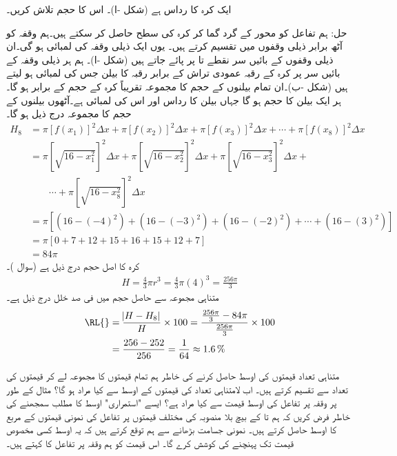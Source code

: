 ایک کرہ کا رداس  ہے (شکل -ا)۔ اس کا حجم تلاش کریں۔

حل:\quad
ہم تفاعل  کو  محور کے گرد گما کر کرہ کی سطح حاصل کر سکتے ہیں۔ہم وقفہ  کو آٹھ برابر ذیلی وقفوں میں تقسیم کرتے ہیں۔ یوں ایک ذیلی وقفہ کی لمبائی  ہو گی۔ان ذیلی وقفوں کے بائیں سر نقطے  تا  پر پائے جاتے ہیں (شکل -ا)۔ ہم ہر ذیلی وقفہ  کے بائیں سر پر کرہ کے رقبہ عمودی تراش کے برابر رقبہ کا بیلن جس کی لمبائی  ہو لیتے ہیں (شکل -ب)۔ان تمام بیلنوں  کے حجم کا مجموعہ تقریباً کرہ کے حجم کے برابر ہو گا۔ ہر ایک بیلن کا حجم  ہو گا جہاں بیلن کا رداس  اور اس کی لمبائی  ہے۔آٹھوں بیلنوں کے حجم کا مجموعہ درج ذیل ہو گا۔
\begin{align*}
H_8&=\pi[f(x_1)]^2\Delta x+\pi[f(x_2)]^2\Delta x+\pi[f(x_3)]^2\Delta x+\cdots+\pi[f(x_8)]^2\Delta x\\
&=\pi\left[\sqrt{16-x_1^2}\right]^2\Delta x+\pi\left[\sqrt{16-x_2^2}\right]^2\Delta x+\pi\left[\sqrt{16-x_3^2}\right]^2\Delta x+\\
&\quad\quad\cdots+\pi\left[\sqrt{16-x_8^2}\right]^2\Delta x\\
&=\pi[(16-(-4)^2)+(16-(-3)^2)+(16-(-2)^2)+\cdots+(16-(3)^2)]\\
&=\pi[0+7+12+15+16+15+12+7]\\
&=84\pi
\end{align*}
کرہ کا اصل حجم درج ذیل ہے (سوال )۔
\begin{align*}
H=\frac{4}{3}\pi r^3=\frac{4}{3}\pi (4)^3=\frac{256\pi}{3}
\end{align*}
متناہی مجموعہ سے حاصل حجم میں فی صد خلل درج ذیل ہے۔
\begin{align*}
\text{\RL{}}&=\frac{\abs{H-H_8}}{H}\times 100=\frac{\tfrac{256\pi}{3}-84\pi}{\tfrac{256\pi}{3}}\times 100\\
&=\frac{256-252}{256}=\frac{1}{64}\approx \SI{1.6}{\percent}
\end{align*}

متناہی تعداد قیمتوں کی اوسط حاصل کرنے کی خاطر ہم تمام قیمتوں کا مجموعہ لے کر قیمتوں کی تعداد سے تقسیم کرتے ہیں۔ اب لامتناہی تعداد کی قیمتوں کے اوسط سے کیا مراد ہو گا؟ مثال کے طور پر وقفہ  پر تفاعل  کی اوسط قیمت سے کیا مراد ہے؟  ایسے "استمراری" اوسط کا مطلب سمجھنے کی خاطر فرض کریں کہ ہم  تا  کے بیچ بلا منصوبہ   کی مختلف قیمتوں پر تفاعل کی نمونی قیمتوں کے مربع کا اوسط حاصل کرتے ہیں۔ نمونی جسامت بڑھانے سے ہم توقع کرتے ہیں کہ یہ اوسط کسی مخصوص قیمت تک پہنچنے کی کوشش کرے گا۔ اس قیمت کو ہم وقفہ  پر تفاعل کا  کہتے ہیں۔

